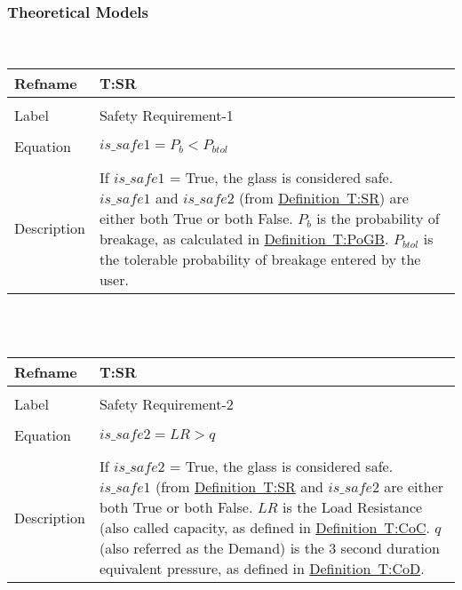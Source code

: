 \documentclass[12pt]{article}
\begin{document}
\subsubsection{Theoretical Models}
\label{Sec:TM}
~\newline
\noindent \begin{minipage}{\textwidth}
\begin{tabular}{p{} p{}}
\toprule \textbf{Refname} & \textbf{T:SR}
\label{T:SR}
\\ \midrule \\
Label & Safety Requirement-1
\\ \midrule \\
Equation & $is\_safe1=P_{b}<P_{btol}$
\\ \midrule \\
Description & If $is\_safe1$ = True, the glass is considered safe. $is\_safe1$ and $is\_safe2$ (from \hyperref[T:SR]{Definition~T:SR}) are either both True or both False. $P_{b}$ is the probability of breakage, as calculated in \hyperref[T:PoGB]{Definition~T:PoGB}. $P_{btol}$ is the tolerable probability of breakage entered by the user.
\\ \bottomrule \end{tabular}
\end{minipage}\\
~\newline
\noindent \begin{minipage}{\textwidth}
\begin{tabular}{p{} p{}}
\toprule \textbf{Refname} & \textbf{T:SR}
\label{T:SR}
\\ \midrule \\
Label & Safety Requirement-2
\\ \midrule \\
Equation & $is\_safe2=LR>q$
\\ \midrule \\
Description & If $is\_safe2$ = True, the glass is considered safe. $is\_safe1$ (from \hyperref[T:SR]{Definition~T:SR} and $is\_safe2$ are either both True or both False. $LR$ is the Load Resistance (also called capacity, as defined in \hyperref[T:CoC]{Definition~T:CoC}. $q$ (also referred as the Demand) is the 3 second duration equivalent pressure, as defined in \hyperref[T:CoD]{Definition~T:CoD}.
\\ \bottomrule \end{tabular}
\end{minipage}\\
\end{document}
